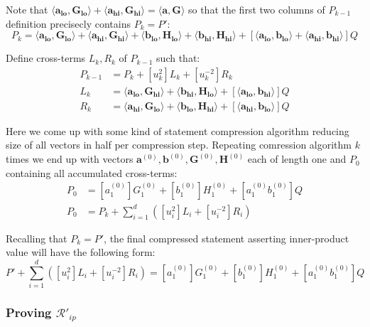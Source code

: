 \documentclass[../lecture-notes-148x210.tex]{subfiles}
\begin{document}
Note that $\langle \mathbf{a_{lo}}, \mathbf{G_{lo}}\rangle + \langle \mathbf{a_{hi}}, \mathbf{G_{hi}}\rangle = \langle \mathbf{a,G}\rangle$ so that the first two columns of $P_{k-1}$ definition precisecly contains $P_{k} = P'$:
$$P_{k} = \langle \mathbf{a_{lo}}, \mathbf{G_{lo}}\rangle + \langle \mathbf{a_{hi}}, \mathbf{G_{hi}}\rangle + \langle \mathbf{b_{lo}}, \mathbf{H_{lo}}\rangle + \langle \mathbf{b_{hi}}, \mathbf{H_{hi}}\rangle + [\langle \mathbf{a_{lo}}, \mathbf{b_{lo}}\rangle + \langle \mathbf{a_{hi}}, \mathbf{b_{hi}}\rangle]Q$$

Define cross-terms $L_k, R_k$ of $P_{k-1}$ such that:
\begin{align*}
    P_{k-1} &= P_k + [u_k^2] L_k + [u_k^{-2}] R_k \\
    L_{k} &= \langle \mathbf{a_{lo}}, \mathbf{G_{hi}}\rangle + \langle \mathbf{b_{hi}}, \mathbf{H_{lo}}\rangle + [\langle \mathbf{a_{lo}}, \mathbf{b_{hi}}\rangle]Q \\
    R_{k} &= \langle \mathbf{a_{hi}}, \mathbf{G_{lo}}\rangle + \langle \mathbf{b_{lo}}, \mathbf{H_{hi}}\rangle + [\langle \mathbf{a_{hi}}, \mathbf{b_{lo}}\rangle]Q
\end{align*}

Here we come up with some kind of statement compression algorithm reducing size of all vectors in half per compression step. Repeating comression algorithm $k$ times we end up with vectors $\mathbf{a}^{(0)}, \mathbf{b}^{(0)}, \mathbf{G}^{(0)}, \mathbf{H}^{(0)}$ each of length one and $P_0$ containing all accumulated cross-terms:
\begin{align*}
    P_0 &= [a_1^{(0)}]G_1^{(0)} + [b_1^{(0)}]H_1^{(0)} + [a_1^{(0)}b_1^{(0)}]Q \\
    P_0 &= P_k + \sum_{i=1}^d ([u_i^2]L_i + [u_i^{-2}]R_i)
\end{align*}

Recalling that $P_k = P'$, the final compressed statement asserting inner-product value will have the following form:
\begin{equation}
    P' + \sum_{i=1}^d ([u_i^2]L_i + [u_i^{-2}]R_i) = [a_1^{(0)}]G_1^{(0)} + [b_1^{(0)}]H_1^{(0)} + [a_1^{(0)}b_1^{(0)}]Q
    \label{eq:ip-final-compressed}
\end{equation}

\subsubsection{Proving $\mathcal{R}'_{ip}$}
\end{document}
